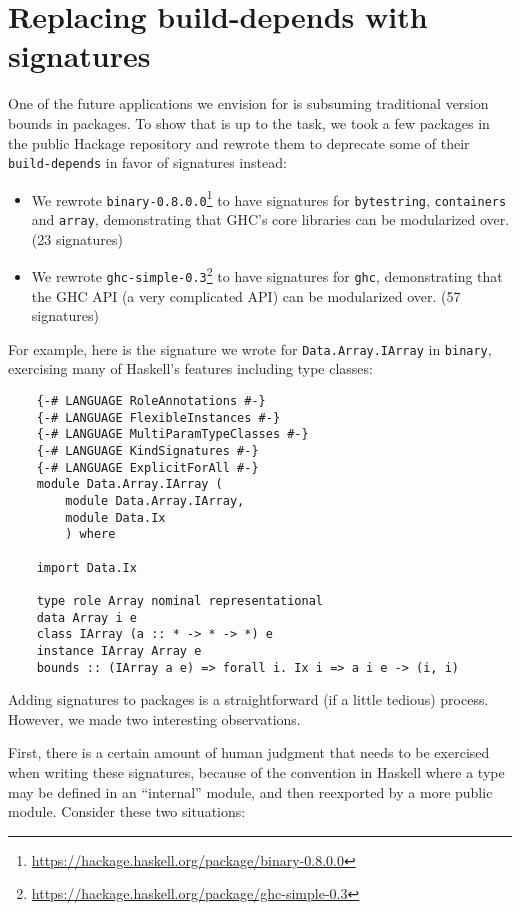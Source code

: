 \section{Replacing build-depends with signatures}

One of the future applications we envision for \Backpack{} is subsuming
traditional version bounds in packages.  To show that \Backpack{} is up
to the task, we took a few packages in the public Hackage repository and
rewrote them to deprecate some of their \verb|build-depends| in favor of
signatures instead:

\begin{itemize}
    \item We rewrote \texttt{binary-0.8.0.0}\footnote{\smaller\url{https://hackage.haskell.org/package/binary-0.8.0.0}}
          to have signatures
          for \texttt{byte\-string}, \texttt{containers} and \texttt{array},
          demonstrating that GHC's core libraries can be modularized
          over. (23 signatures)

    \item We rewrote \texttt{ghc-simple-0.3}\footnote{\smaller\url{https://hackage.haskell.org/package/ghc-simple-0.3}} to have signatures
          for \texttt{ghc}, demonstrating that the GHC API (a very
          complicated API) can be modularized over. (57 signatures)
\end{itemize}
%
For example, here is the signature we wrote for
\texttt{Data.\allowbreak{}Array.\allowbreak{}IArray} in \texttt{binary},
exercising many of Haskell's features including type classes:

\begin{verbatim}
    {-# LANGUAGE RoleAnnotations #-}
    {-# LANGUAGE FlexibleInstances #-}
    {-# LANGUAGE MultiParamTypeClasses #-}
    {-# LANGUAGE KindSignatures #-}
    {-# LANGUAGE ExplicitForAll #-}
    module Data.Array.IArray (
        module Data.Array.IArray,
        module Data.Ix
        ) where

    import Data.Ix

    type role Array nominal representational
    data Array i e
    class IArray (a :: * -> * -> *) e
    instance IArray Array e
    bounds :: (IArray a e) => forall i. Ix i => a i e -> (i, i)
\end{verbatim}
%
Adding signatures to packages is a straightforward (if a little tedious)
process.  However, we made two interesting observations.

First, there is a certain amount of human judgment that needs to be
exercised when writing these signatures, because of the convention in
Haskell where a type may be defined in an ``internal'' module, and then
reexported by a more public module.  Consider these two situations:


